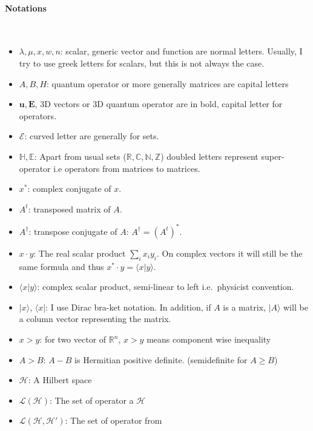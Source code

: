 \documentclass[10pt,a4paper]{report}
\theoremstyle{plain}
\theoremstyle{definition}
\theoremstyle{remark}
\newcommand{\R}{\ensuremath{\mathbb{R}}}
\newcommand{\N}{\ensuremath{\mathbb{N}}}
\newcommand{\Z}{\ensuremath{\mathbb{Z}}}
\newcommand{\C}{\ensuremath{\mathbb{C}}}
\newcommand{\ket}[1]{|#1\rangle}
\newcommand{\bra}[1]{\langle#1|}
\newcommand{\braket}[2]{\langle#1|#2\rangle}
\renewcommand{\geq}{\geqslant}
\newcommand{\bs}{\boldsymbol}
\begin{document}
\vfill

\paragraph{\Huge Notations}

\

\vspace{1.5cm}

\begin{itemize}
  \item $\lambda,\mu,x,w,n$: scalar, generic vector and function are normal
    letters.
    Usually, I try to use greek letters for scalars, but this is not always the case.
  \item $A,B,H$: quantum operator or more generally matrices are capital letters
  \item $\bs u, \bs E$, 3D vectors or 3D quantum operator are in bold, capital
    letter for operators.
  \item $\mathcal{E}$: curved letter are generally for sets.
  \item $\mathbb H, \mathbb E$: Apart from usual sets ($\R,\C,\N,\Z$) doubled
    letters represent super-operator i.e operators from matrices to matrices.
  \item $x^*$: complex conjugate of $x$.
  \item $A^t$: transposed matrix of $A$.
  \item $A^\dagger$: transpose conjugate of $A$: $A^\dagger = {(A^t)}^*$.
  \item $x \cdot y$: The real scalar product $\sum_i x_i y_i$. On complex vectors it
    will still be the same formula and thus $x^* \cdot y = \braket x y$.
  \item $\braket x y$: complex scalar product, semi-linear to left i.e.\ physicist convention.
  \item $\ket x$, $\bra x$: I use Dirac bra-ket notation. In addition, if $A$
    is a matrix, $\ket A$ will be a column vector
    representing the matrix.
  \item $x > y$: for two vector of $\R^n$, $x > y$ means component wise inequality
  \item $A > B$: $A - B$ is Hermitian positive definite. (semidefinite for $A
    \geq B$)
  \item $\mathcal{H}$: A Hilbert space
  \item $\mathcal{L}(\mathcal{H})$: The set of operator a $\mathcal{H}$
  \item $\mathcal{L}(\mathcal{H}, \mathcal{H}')$: The set of operator from

\end{itemize}
\end{document}
